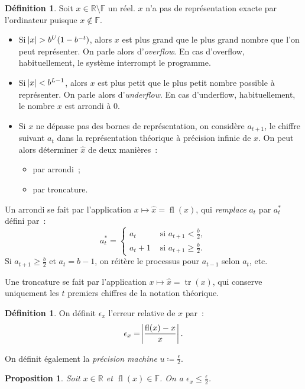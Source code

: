 \documentclass{article}
\newtheorem{prp}[thm]{Proposition}
\theoremstyle{definition}
\newtheorem{déf}[thm]{Définition}
\theoremstyle{remark}
\DeclareMathOperator{\fl}{fl}  %
\DeclareMathOperator{\tr}{tr}  %
\newcommand{\F}{\mathbb F}
\newcommand{\R}{\mathbb R}
\begin{document}
		\begin{déf} Soit $x \in \R \setminus \F$ un réel. $x$ n'a pas de représentation exacte par l'ordinateur puisque $x \not \in \F$.

		\begin{itemize}
			\item Si $\abs x > b^U(1-b^{-t})$, alors $x$ est plus grand que le plus grand nombre que l'on peut représenter. On parle alors d'\emph{overflow}.
			      En cas d'overflow, habituellement, le système interrompt le programme.
			\item Si $\abs x < b^{L-1}$, alors $x$ est plus petit que le plus petit nombre possible à représenter. On parle alors d'\emph{underflow}. En cas
			      d'underflow, habituellement, le nombre $x$ est arrondi à 0.
			\item Si $x$ ne dépasse pas des bornes de représentation, on considère $a_{t+1}$, le chiffre suivant $a_t$ dans la représentation théorique à
			      précision infinie de $x$. On peut alors déterminer $\widehat x$ de deux manières~:
				\begin{itemize}
					\item par arrondi~;
					\item par troncature.
				\end{itemize}
		\end{itemize}

		Un arrondi se fait par l'application $x \mapsto \widehat x = \fl(x)$, qui \emph{remplace} $a_t$ par $a_t^*$ défini par~:
		\[a_t^* = \begin{cases}a_t &\text{ si }a_{t+1} < \frac b2, \\ a_t + 1 &\text{ si }a_{t+1} \geq \frac b2.\end{cases}\]
		Si $a_{t+1} \geq \frac b2$ et $a_t = b-1$, on réitère le processus pour $a_{t-1}$ selon $a_t$, etc.

		Une troncature se fait par l'application $x \mapsto \widehat x = \tr(x)$, qui conserve uniquement les $t$ premiers chiffres de la notation théorique.
		\end{déf}

		\begin{déf} On définit $\epsilon_x$ l'erreur relative de $x$ par~:
		\[\epsilon_x = \abs {\frac {\fl(x)-x}x}.\]

		On définit également la \emph{précision machine} $u \coloneqq \frac \epsilon2$.
		\end{déf}

		\begin{prp} Soit $x \in \R$ et $\fl(x) \in \F$. On a $\epsilon_x \leq \frac \epsilon2$. \end{prp}
\end{document}
